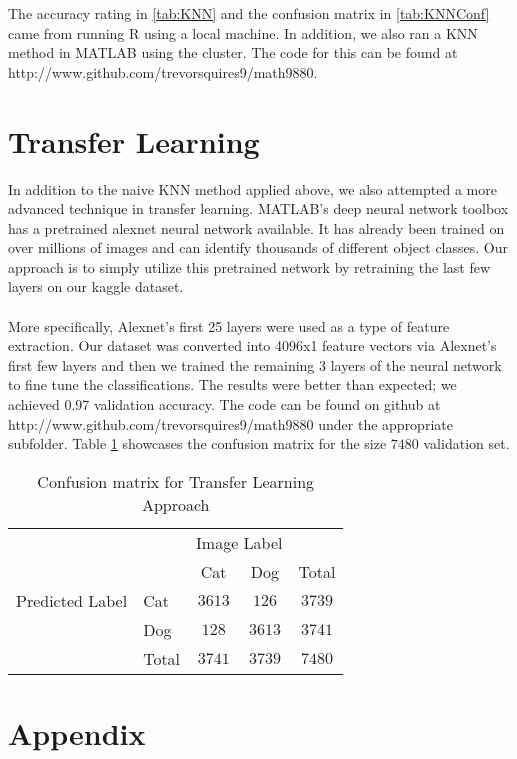 \documentclass[12pt]{article}
\newcommand{\<}{\langle}
\renewcommand{\>}{\rangle}
\theoremstyle{definition}
\begin{document}
The accuracy rating in \ref{tab:KNN} and the confusion matrix in \ref{tab:KNNConf} came from running R using a local machine. In addition, we also ran a KNN method in MATLAB using the cluster. The code for this can be found at http://www.github.com/trevorsquires9/math9880.


\section*{Transfer Learning}
In addition to the naive KNN method applied above, we also attempted a more advanced technique in transfer learning.  MATLAB's deep neural network toolbox has a pretrained alexnet neural network available.  It has already been trained on over millions of images and can identify thousands of different object classes.  Our approach is to simply utilize this pretrained network by retraining the last few layers on our kaggle dataset.  \\\\
More specifically, Alexnet's first 25 layers were used as a type of feature extraction.  Our dataset was converted into 4096x1 feature vectors via Alexnet's first few layers and then we trained the remaining 3 layers of the neural network to fine tune the classifications. The results were better than expected; we achieved 0.97 validation accuracy.  The code can be found on github at http://www.github.com/trevorsquires9/math9880 under the appropriate subfolder. Table \ref{tab:TL} showcases the confusion matrix for the size $7480$ validation set. 
\begin{table}[ht]
\centering
\begin{tabular}{l|l|c|c|c}
\multicolumn{2}{c}{}&\multicolumn{2}{c}{Image Label}&\\
\cline{3-4}
\multicolumn{2}{c|}{}&Cat&Dog&\multicolumn{1}{c}{Total}\\
\cline{2-4}
{Predicted Label}& Cat & $3613$ & $126$ & $3739$\\
\cline{2-4}
& Dog & $128$ & $3613$ & $3741$\\
\cline{2-4}
\multicolumn{1}{c}{} & \multicolumn{1}{c}{Total} & \multicolumn{1}{c}{$3741$} & \multicolumn{    1}{c}{$3739$} & \multicolumn{1}{c}{$7480$}\\
\end{tabular}
\caption{Confusion matrix for Transfer Learning Approach}
\label{tab:TL}
\end{table}
\newpage
\section*{Appendix}
\end{document}
